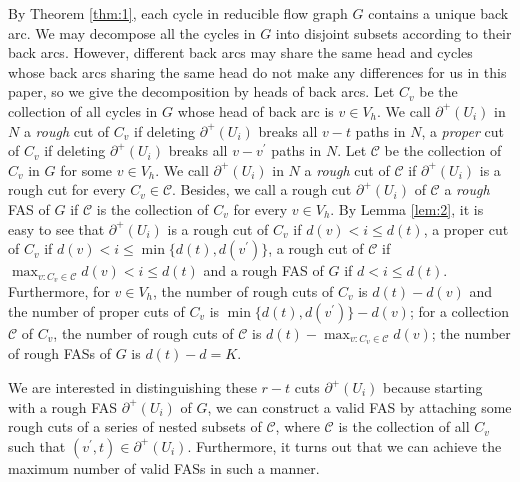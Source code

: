 \documentclass[11pt]{article}
\begin{document}
By Theorem \ref{thm:1}, each cycle in reducible flow graph $G$ contains a unique back arc. We may decompose all the cycles in $G$ into disjoint subsets according to their back arcs. However, different back arcs may share the same head and cycles whose back arcs sharing the same head do not make any differences for us in this paper, so we give the decomposition by heads of back arcs. Let $C_v$ be the collection of all cycles in $G$ whose head of back arc is $v\in V_h$. We call $\partial^+(U_i)$ in $N$ a \emph{rough} cut of $C_v$ if deleting $\partial^+(U_i)$ breaks all $v-t$ paths in $N$, a \emph{proper} cut of $C_v$ if deleting $\partial^+(U_i)$ breaks all $v-v^\prime$ paths in $N$. Let $\mathcal{C}$ be the collection of $C_v$ in $G$ for some $v\in V_h$. We call $\partial^+(U_i)$ in $N$ a \emph{rough} cut of $\mathcal{C}$ if $\partial^+(U_i)$ is a rough cut for every $C_v\in\mathcal{C}$. Besides, we call a rough cut $\partial^+(U_i)$ of $\mathcal{C}$ a \emph{rough} FAS of $G$ if $\mathcal{C}$ is the collection of $C_v$ for every $v\in V_h$. By Lemma \ref{lem:2}, it is easy to see that $\partial^+(U_i)$ is a rough cut of $C_v$ if $d(v) <i\leq d(t)$, a proper cut of $C_v$ if $d(v)<i\leq \min\{d(t),d(v^\prime)\}$, a rough cut of $\mathcal{C}$ if $\max_{v:C_v\in \mathcal{C}}d(v)<i\leq d(t)$ and a rough FAS of $G$ if $d<i\leq d(t)$. Furthermore, for $v\in V_h$, the number of rough cuts of $C_v$ is $d(t)-d(v)$ and the number of proper cuts of $C_v$ is $\min\{d(t),d(v^\prime)\}-d(v)$; for a collection $\mathcal{C}$ of $C_v$, the number of rough cuts of $\mathcal{C}$ is $d(t)-\max_{v:C_v\in \mathcal{C}}d(v)$; the number of rough FASs of $G$ is $d(t)-d=K$.

We are interested in distinguishing these $r-t$ cuts $\partial^+(U_i)$ because starting with a rough FAS $\partial^+(U_i)$ of $G$, we can construct a valid FAS by attaching some rough cuts of a series of nested subsets of $\mathcal{C}$, where $\mathcal{C}$ is the collection of all $C_v$ such that $(v^\prime,t)\in \partial^+(U_i)$. Furthermore, it turns out that we can achieve the maximum number of valid FASs in such a manner.
\end{document}
